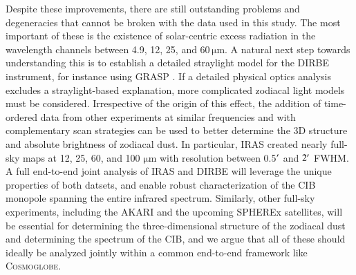 \documentclass{aa}
\def\Cosmoglobe{\textsc{Cosmoglobe}}
\def\Planck{\textit{Planck}}
\begin{document}


Despite these improvements, there are still outstanding problems and degeneracies that cannot be broken with the data used in this study. The most important of these is the existence of solar-centric excess radiation in the wavelength channels between 4.9, 12, 25, and 60\,$\mathrm{\mu m}$. A natural next step towards understanding this is to establish a detailed straylight model for the DIRBE instrument, for instance using GRASP \citep{grasp}. If a detailed physical optics analysis excludes a straylight-based explanation, more complicated zodiacal light models must be considered. Irrespective of the origin of this effect, the addition of time-ordered data from other experiments at similar frequencies and with complementary scan strategies can be used to better determine the 3D structure and absolute brightness of zodiacal dust. In particular, IRAS \citep{boggess92} created nearly full-sky maps at 12, 25, 60, and 100 $\mathrm{\mu m}$ with resolution between 0.5$\arcm$ and $2\arcm$ FWHM. A full end-to-end joint analysis of IRAS and DIRBE will leverage the unique properties of both datsets, and enable robust characterization of the CIB monopole spanning the entire infrared spectrum. Similarly, other full-sky experiments, including the AKARI \citep{murakami:2007} and the upcoming SPHEREx \citep{dore:2014} satellites, will be essential for determining the three-dimensional structure of the zodiacal dust and determining the spectrum of the CIB, and we argue that all of these should ideally be analyzed jointly within a common end-to-end framework like \Cosmoglobe. 
\end{document}
